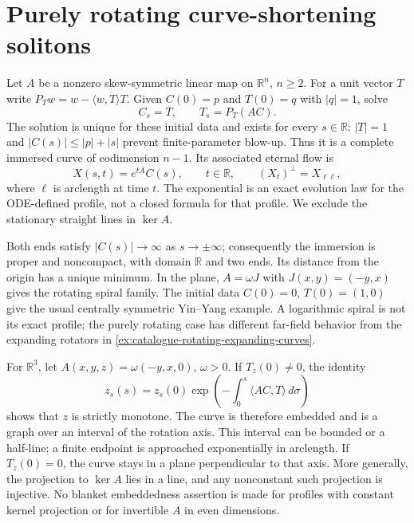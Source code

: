 \chapter{Purely rotating curve-shortening solitons}\label{sec:catalogue-rotating-curves}
\begin{example}\label{ex:catalogue-rotating-curves}
Let $A$ be a nonzero skew-symmetric linear map on $\mathbb R^n$, $n\geq2$. For a unit vector $T$ write $P_Tw=w-\langle w,T\rangle T$. Given $C(0)=p$ and $T(0)=q$ with $|q|=1$, solve
\[
 C_s=T,\qquad T_s=P_T(AC).
\]
The solution is unique for these initial data and exists for every $s\in\mathbb R$: $|T|=1$ and $|C(s)|\leq|p|+|s|$ prevent finite-parameter blow-up. Thus it is a complete immersed curve of codimension $n-1$. Its associated eternal flow is
\[
 X(s,t)=e^{tA}C(s),\qquad t\in\mathbb R,
 \qquad (X_t)^\perp=X_{\ell\ell},
\]
where $\ell$ is arclength at time $t$. The exponential is an exact evolution law for the ODE-defined profile, not a closed formula for that profile. We exclude the stationary straight lines in $\ker A$.

Both ends satisfy $|C(s)|\to\infty$ as $s\to\pm\infty$; consequently the immersion is proper and noncompact, with domain $\mathbb R$ and two ends. Its distance from the origin has a unique minimum. In the plane, $A=\omega J$ with $J(x,y)=(-y,x)$ gives the rotating spiral family. The initial data $C(0)=0$, $T(0)=(1,0)$ give the usual centrally symmetric Yin--Yang example. A logarithmic spiral is not its exact profile; the purely rotating case has different far-field behavior from the expanding rotators in \ref{ex:catalogue-rotating-expanding-curves}.

For $\mathbb R^3$, let $A(x,y,z)=\omega(-y,x,0)$, $\omega>0$. If $T_z(0)\ne0$, the identity
\[
 z_s(s)=z_s(0)\exp\left(-\int_0^s\langle AC,T\rangle\,d\sigma\right)
\]
shows that $z$ is strictly monotone. The curve is therefore embedded and is a graph over an interval of the rotation axis. This interval can be bounded or a half-line; a finite endpoint is approached exponentially in arclength. If $T_z(0)=0$, the curve stays in a plane perpendicular to that axis. More generally, the projection to $\ker A$ lies in a line, and any nonconstant such projection is injective. No blanket embeddedness assertion is made for profiles with constant kernel projection or for invertible $A$ in even dimensions.


\end{example}
